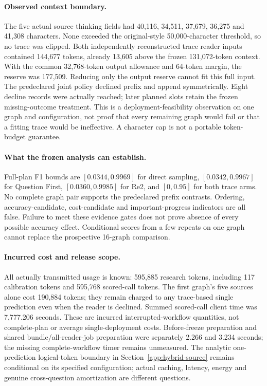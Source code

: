 \documentclass[10pt]{article}
\begin{document}
\paragraph{Observed context boundary.} The five actual source thinking fields had 40,116, 34,511, 37,679, 36,275 and 41,308 characters. None exceeded the original-style 50,000-character threshold, so no trace was clipped. Both independently reconstructed trace reader inputs contained 144,677 tokens, already 13,605 above the frozen 131,072-token context. With the common 32,768-token output allowance and 64-token margin, the reserve was 177,509. Reducing only the output reserve cannot fit this full input. The predeclared joint policy declined prefix and append symmetrically. Eight decline records were actually reached; later planned slots retain the frozen missing-outcome treatment. This is a deployment-feasibility observation on one graph and configuration, not proof that every remaining graph would fail or that a fitting trace would be ineffective. A character cap is not a portable token-budget guarantee.

\paragraph{What the frozen analysis can establish.} Full-plan F1 bounds are $[0.0344,0.9969]$ for direct sampling, $[0.0342,0.9967]$ for Question First, $[0.0360,0.9985]$ for Re2, and $[0,0.95]$ for both trace arms. No complete graph pair supports the predeclared prefix contrasts. Ordering, accuracy-candidate, cost-candidate and important-progress indicators are all false. Failure to meet these evidence gates does not prove absence of every possible accuracy effect. Conditional scores from a few repeats on one graph cannot replace the prospective 16-graph comparison.

\paragraph{Incurred cost and release scope.} All actually transmitted usage is known: 595,885 research tokens, including 117 calibration tokens and 595,768 scored-call tokens. The first graph's five sources alone cost 190,884 tokens; they remain charged to any trace-based single prediction even when the reader is declined. Summed scored-call client time was 7,777.206 seconds. These are incurred interrupted-workflow quantities, not complete-plan or average single-deployment costs. Before-freeze preparation and shared bundle/all-reader-job preparation were separately 2.266 and 3.234 seconds; the missing complete-workflow timer remains unmeasured. The analytic one-prediction logical-token boundary in Section~\ref{app:hybrid-source} remains conditional on its specified configuration; actual caching, latency, energy and genuine cross-question amortization are different questions.
\end{document}
